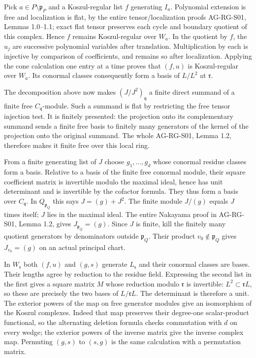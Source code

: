 \documentclass[11pt,a4paper,openany]{report}
\begin{document}
Pick \(a\in P\setminus\mathfrak p_P\) and a Koszul-regular list \(f\) generating \(I_a\). Polynomial extension is free and localization is flat, by the entire tensor/localization proofs AG-RG-S01, Lemmas 1.0--1.1; exact flat tensor preserves each cycle and boundary quotient of this complex. Hence \(f\) remains Koszul-regular over \(W_a\). In the quotient by \(f\), the \(u_j\) are successive polynomial variables after translation. Multiplication by each is injective by comparison of coefficients, and remains so after localization. Applying the cone calculation one entry at a time proves that \((f,u)\) is Koszul-regular over \(W_a\). Its conormal classes consequently form a basis of \(L/L^2\) at \(\mathfrak r\).

The decomposition above now makes \((J/J^2)_{\mathfrak q}\) a finite direct summand of a finite free \(C_{\mathfrak q}\)-module. Such a summand is flat by restricting the free tensor injection test. It is finitely presented: the projection onto its complementary summand sends a finite free basis to finitely many generators of the kernel of the projection onto the original summand. The whole AG-RG-S01, Lemma 1.2, therefore makes it finite free over this local ring.

From a finite generating list of \(J\) choose \(g_1,\ldots,g_d\) whose conormal residue classes form a basis. Relative to a basis of the finite free conormal module, their square coefficient matrix is invertible modulo the maximal ideal, hence has unit determinant and is invertible by the cofactor formula. They thus form a basis over \(C_{\mathfrak q}\). In \(Q_{\mathfrak p_Q}\) this says \(J=(g)+J^2\). The finite module \(J/(g)\) equals \(J\) times itself; \(J\) lies in the maximal ideal. The entire Nakayama proof in AG-RG-S01, Lemma 1.2, gives \(J_{\mathfrak p_Q}=(g)\). Since \(J\) is finite, kill the finitely many quotient generators by denominators outside \(\mathfrak p_Q\). Their product \(v_0\notin\mathfrak p_Q\) gives \(J_{v_0}=(g)\) on an actual principal chart.

In \(W_{\mathfrak r}\) both \((f,u)\) and \((g,s)\) generate \(L_{\mathfrak r}\) and their conormal classes are bases. Their lengths agree by reduction to the residue field. Expressing the second list in the first gives a square matrix \(M\) whose reduction modulo \(\mathfrak r\) is invertible: \(L^2\subset\mathfrak rL\), so these are precisely the two bases of \(L/\mathfrak rL\). The determinant is therefore a unit. The exterior powers of the map on free generator modules give an isomorphism of the Koszul complexes. Indeed that map preserves their degree-one scalar-product functional, so the alternating deletion formula checks commutation with \(d\) on every wedge; the exterior powers of the inverse matrix give the inverse complex map. Permuting \((g,s)\) to \((s,g)\) is the same calculation with a permutation matrix.
\end{document}
